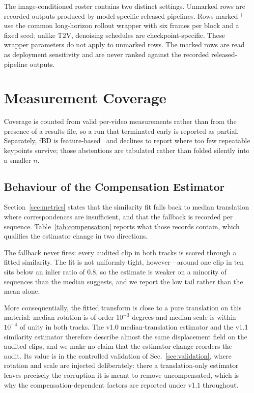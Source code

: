 \documentclass[10pt,twocolumn,letterpaper]{article}
\begin{document}
The image-conditioned roster contains two distinct settings. Unmarked rows are
recorded outputs produced by model-specific released pipelines. Rows
marked $^{\dagger}$ use the common long-horizon rollout wrapper with six frames
per block and a fixed seed; unlike T2V, denoising schedules are
checkpoint-specific. These wrapper parameters
do not apply to unmarked rows. The marked rows are read as deployment
sensitivity and are never ranked against the recorded released-pipeline outputs.



\section{Measurement Coverage}
\label{sup:coverage}

Coverage is counted from valid per-video measurements rather than from the
presence of a results file, so a run that terminated early is reported as
partial. Separately, fBD is feature-based~\cite{rublee2011orb} and declines to
report where too few repeatable keypoints survive; those abstentions are
tabulated rather than folded silently into a smaller $n$.




\subsection{Behaviour of the Compensation Estimator}
\label{sup:compensation}

Section~\ref{sec:metrics} states that the similarity fit falls back to median
translation where correspondences are insufficient, and that the fallback is
recorded per sequence. Table~\ref{tab:compensation} reports what those records
contain, which qualifies the estimator change in two directions.

The fallback never fires: every audited clip in both tracks is scored through a
fitted similarity. The fit is not uniformly tight, however---around one clip in
ten sits below an inlier ratio of $0.8$, so the estimate is weaker on a minority
of sequences than the median suggests, and we report the low tail rather than
the mean alone.

More consequentially, the fitted transform is close to a pure translation on
this material: median rotation is of order $10^{-3}$ degrees and median scale is
within $10^{-4}$ of unity in both tracks. The v1.0 median-translation estimator
and the v1.1 similarity estimator therefore describe almost the same
displacement field on the audited clips, and we make no claim that the estimator
change reorders the audit. Its value is in the controlled validation of
Sec.~\ref{sec:validation}, where rotation and scale are injected deliberately:
there a translation-only estimator leaves precisely the corruption it is meant
to remove uncompensated, which is why the compensation-dependent factors are
reported under v1.1 throughout.
\end{document}

